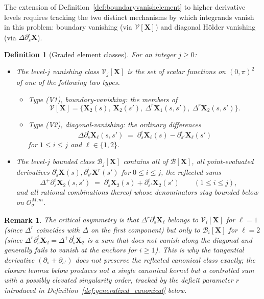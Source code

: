 \documentclass{amsart}
\newtheorem{remark}{Remark}[section]
\newtheorem{definition}[theorem]{Definition}
\begin{document}
The extension of Definition~\ref{def:boundaryvanishelement} to higher derivative levels requires tracking the two distinct mechanisms by which integrands vanish in this problem: boundary vanishing (via $\mathcal{V}[\mathbf{X}]$) and diagonal Hölder vanishing (via $\Delta\partial_s^{i}\mathbf{X}$).

\begin{definition}[Graded element classes]\label{def:graded_classes}
For an integer $j \ge 0$:
\begin{itemize}
\item[(i)] The \emph{level-$j$ vanishing class} $\mathcal{V}_j[\mathbf{X}]$ is the set of scalar functions on $(0,\pi)^2$ of one of the following two types.
\begin{itemize}
\item \emph{Type (V1), boundary-vanishing:} the members of
\[\mathcal{V}[\mathbf{X}] = \bigl\{
\mathbf{X}_2(s),\ \mathbf{X}_2(s'),\ \Delta^r\mathbf{X}_1(s,s'),\ \Delta^r\mathbf{X}_2(s,s')\bigr\}.\]
\item \emph{Type (V2), diagonal-vanishing:} the \emph{ordinary} differences
\[
\Delta\partial_s^i \mathbf{X}_\ell(s,s')
\;=\; \partial_s^i \mathbf{X}_\ell(s) - \partial_{s'}^i \mathbf{X}_\ell(s')
\]
for $1 \le i \le j$ and $\ell \in \{1, 2\}$.
\end{itemize}

\item[(ii)] The \emph{level-$j$ bounded class} $\mathcal{B}_j[\mathbf{X}]$ contains all of $\mathcal{B}[\mathbf{X}]$, all point-evaluated derivatives $\partial_s^i \mathbf{X}(s),\partial_{s'}^i\mathbf{X}^r(s')$ for $0 \le i \le j$, the \emph{reflected sums}
\[
\Delta^+\partial_s^i\mathbf{X}_2(s,s') \;=\; \partial_s^i\mathbf{X}_2(s) + \partial_{s'}^i\mathbf{X}_2(s')
\qquad (1 \le i \le j),
\]
and all rational combinations thereof whose denominators stay bounded below on $\mathcal{O}^{M,m}_\sigma$.
\end{itemize}
\end{definition}

\begin{remark}
The critical asymmetry is that $\Delta^r\partial_s^i\mathbf{X}_\ell$ belongs to $\mathcal{V}_i[\mathbf{X}]$ for $\ell = 1$ (since $\Delta^r$ coincides with $\Delta$ on the first component) but only to $\mathcal{B}_i[\mathbf{X}]$ for $\ell = 2$ (since $\Delta^r\partial_s^i\mathbf{X}_2 = \Delta^+\partial_s^i\mathbf{X}_2$ is a \emph{sum} that does not vanish along the diagonal and generally fails to vanish at the anchors for $i \ge 1$).  This is why the tangential derivative $(\partial_s + \partial_{s'})$ does not preserve the reflected canonical class exactly; the closure lemma below produces not a single canonical kernel but a controlled sum with a possibly elevated singularity order, tracked by the \emph{deficit} parameter $r$ introduced in Definition~\ref{def:generalized_canonical} below.
\end{remark}
\end{document}
